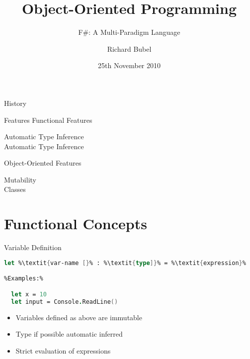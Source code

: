 \documentclass{beamer}
\title[]{Object-Oriented Programming}
\subtitle[F\#]{F\#: A Multi-Paradigm Language} %
\author[Richard Bubel] %
{Richard Bubel}
\institute[CTH]{Chalmers University of Technology}
\date{25th November 2010}%
\newcommand{\Blue}[1]{\color{blue}#1\color{black}\xspace}
\begin{document}
\begin{frame}
  \titlepage
\end{frame}

\begin{frame}{History}
\end{frame}

\begin{frame}{Features}
  \Blue{Functional Features}
  \begin{description}
    \item[Automatic Type Inference]
    \item[Automatic Type Inference]
 \end{description}
 
  \Blue{Object-Oriented Features}
  \begin{description}
    \item[Mutability]
    \item[Classes]
 \end{description}

\end{frame}

\section{Functional Concepts}

\begin{frame}[fragile]{Variable Definition}
\begin{lstlisting}[language=FSharp, escapechar=\%]
  let %\textit{var-name [}% : %\textit{type]}% = %\textit{expression}%

%Examples:%

  let x = 10
  let input = Console.ReadLine()
\end{lstlisting}
  
\begin{itemize}
\item Variables defined as above are immutable
\item Type if possible automatic inferred
\item Strict evaluation of expressions
\end{itemize}

\end{frame}
\end{document}
